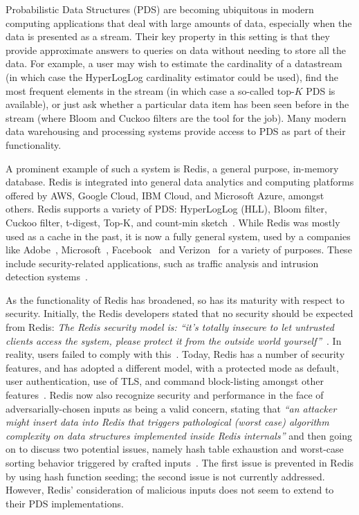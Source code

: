 Probabilistic Data Structures (PDS) are becoming ubiquitous in modern computing applications that deal with large amounts of data, especially when the data is presented as a stream. 
Their key property in this setting is that they provide approximate answers to queries on data without needing to store all the data. 
For example, a user may wish to estimate the cardinality of a datastream (in which case the HyperLogLog cardinality estimator could be used), find the most frequent elements in the stream (in which case a so-called top-$K$ PDS is available), or just ask whether a particular data item has been seen before in the stream (where Bloom and Cuckoo filters are the tool for the job). 
Many modern data warehousing and processing systems provide access to PDS as part of their functionality. 

A prominent example of such a system is Redis, a general purpose, in-memory database. Redis is integrated into general data analytics and computing platforms offered by AWS, Google Cloud, IBM Cloud, and Microsoft Azure, amongst others. 
Redis supports a variety of PDS: HyperLogLog (HLL), Bloom filter, Cuckoo filter, t-digest, Top-K, and count-min sketch~\cite{redisPDS}. 
While Redis was mostly used as a cache in the past, it is now a fully general system, used by a companies like Adobe~\cite{Web:RedisForAdobe}, Microsoft~\cite{Web:RedisForMicrosoft}, Facebook~\cite{Web:RedisForFacebook} and Verizon~\cite{Web:RedisForVerizon} for a variety of purposes. These include security-related applications, such as traffic analysis and intrusion detection systems~\cite{Web:RedisForSiemens}.

As the functionality of Redis has broadened, so has its maturity with respect to security. Initially, the Redis developers stated that no security should be expected from Redis: \emph{
The Redis security model is: “it’s totally insecure to let untrusted clients access the system, please protect it from the outside world yourself”}~\cite{antirez15}. In reality, users failed to comply with this~\cite{FiebigFP16}. Today, Redis has a number of security features, and has adopted a different model, with a protected mode as default, user authentication, use of TLS, and command block-listing amongst other features~\cite{redisSec}. Redis now also recognize security and performance in the face of adversarially-chosen inputs as being a valid concern, stating that \emph{``an attacker might insert data into Redis that triggers pathological (worst case) algorithm complexity on data structures implemented inside Redis internals''} and then going on to discuss two potential issues, namely hash table exhaustion and worst-case sorting behavior triggered by crafted inputs~\cite{redisSec}. The first issue is prevented in Redis by using hash function seeding; the second issue is not currently addressed. However, Redis' consideration of malicious inputs does not seem to extend to their PDS implementations.

